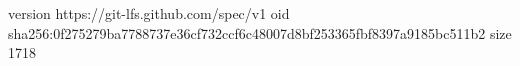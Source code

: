 version https://git-lfs.github.com/spec/v1
oid sha256:0f275279ba7788737e36cf732ccf6c48007d8bf253365fbf8397a9185bc511b2
size 1718
